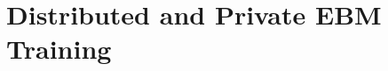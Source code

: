 \documentclass[11pt]{article}
\newcommand{\algo}{\textsc{eff-EBM}}
\begin{document}


\section{Distributed and Private EBM Training}
\end{document}

